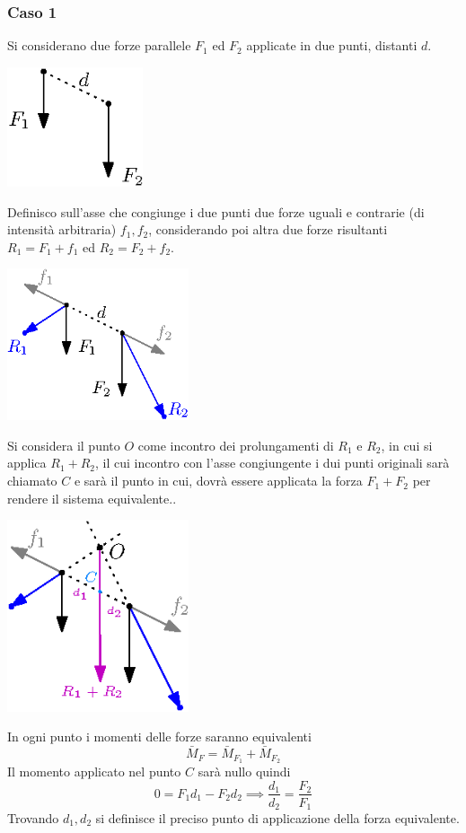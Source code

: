 \documentclass[10pt, letterpaper]{report}
\begin{document}
\subsubsection{Caso 1}
Si considerano due forze parallele $F_1$ ed $F_2$ applicate in due punti, distanti $d$.\begin{center}
    \includegraphics[width=0.3\textwidth ]{images/forzeEq1.eps}
\end{center}
Definisco sull'asse che congiunge i due punti due forze uguali e contrarie (di intensità arbitraria) $f_1,f_2$, 
considerando poi altra due forze risultanti $R_1=F_1+f_1$ ed $R_2=F_2+f_2$.
\begin{center}
    \includegraphics[width=0.4\textwidth ]{images/forzeEq2.eps}
\end{center}
Si considera il punto $O$ come incontro dei prolungamenti di $R_1$ e $R_2$, in cui si applica $R_1+R_2$, il cui incontro con l'asse congiungente i dui punti originali sarà chiamato $C$ e sarà il punto in cui, dovrà essere applicata la forza $F_1+F_2$ per rendere il sistema equivalente..
\begin{center}
    \includegraphics[width=0.4\textwidth ]{images/forzeEq3.eps}
\end{center}
In ogni punto i momenti delle forze saranno equivalenti 
$$ \bar M_F=\bar M_{F_1}+\bar M_{F_2}$$
Il momento applicato nel punto $C$ sarà nullo quindi 
$$ 0=F_1d_1-F_2d_2\implies \frac{d_1}{d_2}=\frac{F_2}{F_1}$$
Trovando $d_1,d_2$ si definisce il preciso punto di applicazione della forza equivalente.
\end{document}
